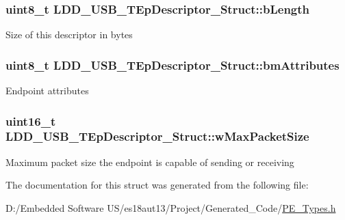 \subsubsection[{b\+Length}]{\setlength{\rightskip}{0pt plus 5cm}uint8\+\_\+t L\+D\+D\+\_\+\+U\+S\+B\+\_\+\+T\+Ep\+Descriptor\+\_\+\+Struct\+::b\+Length}\label{struct_l_d_d___u_s_b___t_ep_descriptor___struct_ad4cc2b6088c7fb913f40eada94098393}
Size of this descriptor in bytes \hypertarget{struct_l_d_d___u_s_b___t_ep_descriptor___struct_a7a3e6205355d7fa84899f23ac8e58490}{}
\subsubsection[{bm\+Attributes}]{\setlength{\rightskip}{0pt plus 5cm}uint8\+\_\+t L\+D\+D\+\_\+\+U\+S\+B\+\_\+\+T\+Ep\+Descriptor\+\_\+\+Struct\+::bm\+Attributes}\label{struct_l_d_d___u_s_b___t_ep_descriptor___struct_a7a3e6205355d7fa84899f23ac8e58490}
Endpoint attributes \hypertarget{struct_l_d_d___u_s_b___t_ep_descriptor___struct_a19e3e6b0524f2fcd25377f008c94c3c6}{}
\subsubsection[{w\+Max\+Packet\+Size}]{\setlength{\rightskip}{0pt plus 5cm}uint16\+\_\+t L\+D\+D\+\_\+\+U\+S\+B\+\_\+\+T\+Ep\+Descriptor\+\_\+\+Struct\+::w\+Max\+Packet\+Size}\label{struct_l_d_d___u_s_b___t_ep_descriptor___struct_a19e3e6b0524f2fcd25377f008c94c3c6}
Maximum packet size the endpoint is capable of sending or receiving 

The documentation for this struct was generated from the following file\+:\begin{DoxyCompactItemize}
\item 
D\+:/\+Embedded Software U\+S/es18aut13/\+Project/\+Generated\+\_\+\+Code/\hyperlink{_p_e___types_8h}{P\+E\+\_\+\+Types.\+h}\end{DoxyCompactItemize}
